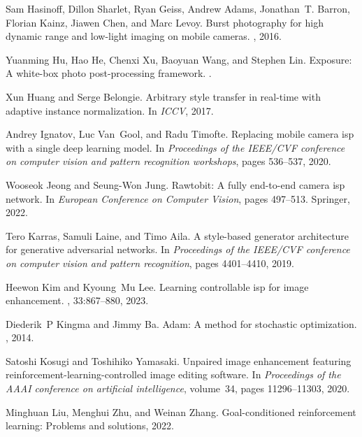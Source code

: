 \documentclass{article}
\begin{document}
\begin{thebibliography}{10}
Sam Hasinoff, Dillon Sharlet, Ryan Geiss, Andrew Adams, Jonathan~T. Barron, Florian Kainz, Jiawen Chen, and Marc Levoy.
\newblock Burst photography for high dynamic range and low-light imaging on mobile cameras.
, 2016.

Yuanming Hu, Hao He, Chenxi Xu, Baoyuan Wang, and Stephen Lin.
\newblock Exposure: A white-box photo post-processing framework.
.

Xun Huang and Serge Belongie.
\newblock Arbitrary style transfer in real-time with adaptive instance normalization.
\newblock In {\em {ICCV}}, 2017.

Andrey Ignatov, Luc Van~Gool, and Radu Timofte.
\newblock Replacing mobile camera isp with a single deep learning model.
\newblock In {\em Proceedings of the IEEE/CVF conference on computer vision and pattern recognition workshops}, pages 536--537, 2020.

Wooseok Jeong and Seung-Won Jung.
\newblock Rawtobit: A fully end-to-end camera isp network.
\newblock In {\em European Conference on Computer Vision}, pages 497--513. Springer, 2022.

Tero Karras, Samuli Laine, and Timo Aila.
\newblock A style-based generator architecture for generative adversarial networks.
\newblock In {\em Proceedings of the IEEE/CVF conference on computer vision and pattern recognition}, pages 4401--4410, 2019.

Heewon Kim and Kyoung~Mu Lee.
\newblock Learning controllable isp for image enhancement.
, 33:867--880, 2023.

Diederik~P Kingma and Jimmy Ba.
\newblock Adam: A method for stochastic optimization.
, 2014.

Satoshi Kosugi and Toshihiko Yamasaki.
\newblock Unpaired image enhancement featuring reinforcement-learning-controlled image editing software.
\newblock In {\em Proceedings of the AAAI conference on artificial intelligence}, volume~34, pages 11296--11303, 2020.

Minghuan Liu, Menghui Zhu, and Weinan Zhang.
\newblock Goal-conditioned reinforcement learning: Problems and solutions, 2022.


\end{thebibliography}
\end{document}
